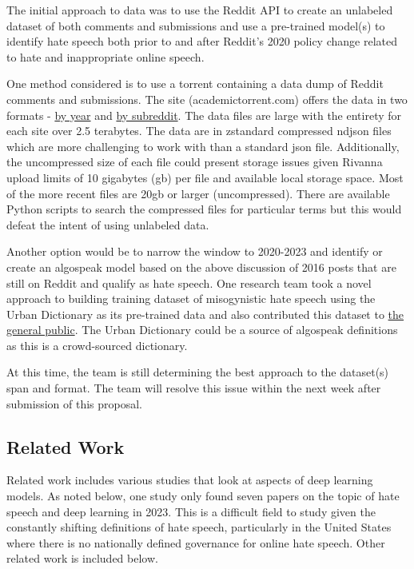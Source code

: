 \documentclass[conference]{IEEEtran}
\begin{document}
The initial approach to data was to use the Reddit API to create an unlabeled dataset of both comments and submissions and use a pre-trained model(s) to identify hate speech both prior to and after Reddit's 2020 policy change related to hate and inappropriate online speech. 

One method considered is to use a torrent containing a data dump of Reddit comments and submissions. The site (academictorrent.com) offers the data in two formats - \href{https://academictorrents.com/details/9c263fc85366c1ef8f5bb9da0203f4c8c8db75f4}{by year} and \href{https://academictorrents.com/details/56aa49f9653ba545f48df2e33679f014d2829c10}{by subreddit}. The data files are large with the entirety for each site over 2.5 terabytes.  The data are in zstandard compressed ndjson files which are more challenging to work with than a standard json file. Additionally, the uncompressed size of each file could present storage issues given Rivanna upload limits of 10 gigabytes (gb) per file and available local storage space. Most of the more recent files are 20gb or larger (uncompressed). There are available Python scripts to search the compressed files for particular terms but this would defeat the intent of using unlabeled data. 

Another option would be to narrow the window to 2020-2023 and identify or create an algospeak model based on the above discussion of 2016 posts that are still on Reddit and qualify as hate speech. One research team took a novel approach to building training dataset of misogynistic hate speech using the Urban Dictionary\cite{b15} as its pre-trained data and also contributed this dataset to \href{https://www.kaggle.com/datasets/therohk/urban-dictionary-words-dataset/data}{the general public}. The Urban Dictionary could be a source of algospeak definitions as this is a crowd-sourced dictionary.  

At this time, the team is still determining the best approach to the dataset(s) span and format. The team will resolve this issue within the next week after submission of this proposal. 

\subsection{Related Work}

Related work includes various studies that look at aspects of deep learning models. As noted below, one study only found seven papers on the topic of hate speech and deep learning in 2023. This is a difficult field to study given the constantly shifting definitions of hate speech, particularly in the United States where there is no nationally defined governance for online hate speech. Other related work is included below. 
\end{document}
